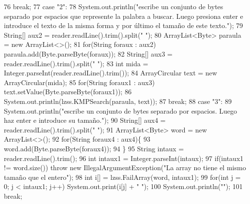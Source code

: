 \begin{DoxyCode}
76                 \textcolor{keywordflow}{break};
77                 \textcolor{keywordflow}{case} \textcolor{stringliteral}{"2"}:
78                     System.out.println(\textcolor{stringliteral}{"escribe un conjunto de bytes separado por espacios que represente
       la palabra a buscar. Luego presiona enter e introduce el texto de la misma forma y por último el tamaño de
       este texto."});
79                     String[] aux2 = reader.readLine().trim().split(\textcolor{stringliteral}{" "});
80                     ArrayList<Byte> paraula = \textcolor{keyword}{new} ArrayList<>();
81                     \textcolor{keywordflow}{for}(String foraux : aux2) paraula.add(Byte.parseByte(foraux));
82                     String[] aux3 = reader.readLine().trim().split(\textcolor{stringliteral}{" "});
83                     \textcolor{keywordtype}{int} mida = Integer.parseInt(reader.readLine().trim());
84                     ArrayCircular text = \textcolor{keyword}{new} ArrayCircular(mida);
85                     \textcolor{keywordflow}{for}(String foraux1 : aux3) text.setValue(Byte.parseByte(foraux1));
86                     System.out.println(lzss.KMPSearch(paraula, text));
87                 \textcolor{keywordflow}{break};
88                 \textcolor{keywordflow}{case} \textcolor{stringliteral}{"3"}:
89                     System.out.println(\textcolor{stringliteral}{"escribe un conjunto de bytes separado por espacios. Luego haz enter
       e introduce su tamaño."});
90                     String[] aux4 = reader.readLine().trim().split(\textcolor{stringliteral}{" "});
91                     ArrayList<Byte> word = \textcolor{keyword}{new} ArrayList<>();
92                     \textcolor{keywordflow}{for}(String foraux4 : aux4)\{
93                         word.add(Byte.parseByte(foraux4));
94                     \}
95                     String intaux = reader.readLine().trim();
96                     \textcolor{keywordtype}{int} intaux1 = Integer.parseInt(intaux);
97                     \textcolor{keywordflow}{if}(intaux1 != word.size()) \textcolor{keywordflow}{throw} \textcolor{keyword}{new} IllegalArgumentException(\textcolor{stringliteral}{"La array no tiene el
       mismo tamaño que el entero"});
98                     \textcolor{keywordtype}{int} i[] = lzss.FailArray(word, intaux1);
99                     \textcolor{keywordflow}{for}(\textcolor{keywordtype}{int} j = 0; j < intaux1; j++) System.out.print(i[j] + \textcolor{stringliteral}{" "});
100                     System.out.println(\textcolor{stringliteral}{""});
101                 \textcolor{keywordflow}{break};

\end{DoxyCode}
